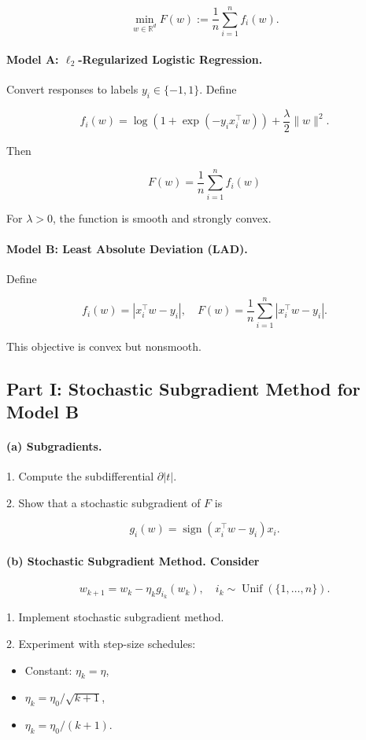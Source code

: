 \documentclass[en,hazy,blue,12pt,normal]{elegantnote}
\begin{document}
$$
\min _{w \in \mathbb{R}^d} F(w):=\frac{1}{n} \sum_{i=1}^n f_i(w) .
$$


\paragraph{Model A: $\ell_2$-Regularized Logistic Regression.} Convert responses to labels $y_i \in\{-1,1\}$. Define

$$
f_i(w)=\log \left(1+\exp \left(-y_i x_i^{\top} w\right)\right)+\frac{\lambda}{2}\|w\|^2 .
$$


Then

$$
F(w)=\frac{1}{n} \sum_{i=1}^n f_i(w)
$$


For $\lambda>0$, the function is smooth and strongly convex.

\paragraph{Model B: Least Absolute Deviation (LAD).} Define

$$
f_i(w)=\left|x_i^{\top} w-y_i\right|, \quad F(w)=\frac{1}{n} \sum_{i=1}^n\left|x_i^{\top} w-y_i\right| .
$$


This objective is convex but nonsmooth.
\subsection{Part I: Stochastic Subgradient Method for Model B}

\paragraph{(a) Subgradients.}

1. Compute the subdifferential $\partial|t|$.

2. Show that a stochastic subgradient of $F$ is

$$
g_i(w)=\operatorname{sign}\left(x_i^{\top} w-y_i\right) x_i .
$$

\paragraph{(b) Stochastic Subgradient Method. Consider}

$$
w_{k+1}=w_k-\eta_k g_{i_k}\left(w_k\right), \quad i_k \sim \operatorname{Unif}(\{1, \ldots, n\}) .
$$

1. Implement stochastic subgradient method.

2. Experiment with step-size schedules:
\begin{itemize}
    \item  Constant: $\eta_k=\eta$,
    \item $\eta_k=\eta_0 / \sqrt{k+1}$,
    \item $\eta_k=\eta_0 /(k+1)$.
\end{itemize}
\end{document}
